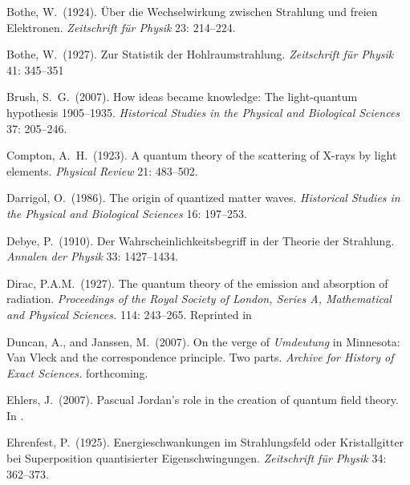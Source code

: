 \documentclass{elsart}
\begin{document}
{\begin{thebibliography}{}
 Bothe, W.\ (1924). \"Uber die Wechselwirkung zwischen Strahlung und freien Elektronen. {\it Zeitschrift f\"ur Physik} 23: 214--224.

 Bothe, W.\ (1927). Zur Statistik der Hohlraumstrahlung. {\it Zeitschrift f\"ur Physik} 41: 345--351


 Brush, S.\ G.\ (2007). How ideas became knowledge: The light-quantum hypothesis 1905--1935. {\it Historical Studies in the Physical and Biological Sciences} 37: 205--246.

 Compton, A.\ H.\ (1923). A quantum theory of the scattering of X-rays by light elements. {\it Physical Review} 21: 483--502.

 Darrigol, O.\ (1986). The origin of quantized matter waves. {\it Historical Studies in the Physical and Biological Sciences} 16: 197--253.

 Debye, P.\ (1910). Der Wahrscheinlichkeitsbegriff in der Theorie der Strahlung. {\it Annalen der Physik} 33: 1427--1434.

 Dirac, P.A.M.\ (1927).  The quantum theory of the emission and absorption of radiation. {\it Proceedings of the Royal Society of London, Series A, Mathematical and Physical Sciences.} 114: 243--265. Reprinted in \citep[pp.\ 1--23]{Schwinger 1958}

 Duncan, A., and Janssen, M.\  (2007). On the verge of {\it Umdeutung} in Minnesota: Van Vleck and the correspondence principle. Two parts. {\it Archive for History of Exact Sciences.} forthcoming.

 Ehlers, J.\ (2007). Pascual Jordan's role in the creation of quantum field theory. In \citep[pp.\ 23--35]{Hoffmann 2007}. 


 Ehrenfest, P.\ (1925). Energieschwankungen im Strahlungsfeld oder Kristallgitter bei Superposition quantisierter Eigenschwingungen. 
{\it Zeitschrift f\"{u}r Physik} 34: 362--373.



\end{thebibliography}}
\end{document}
